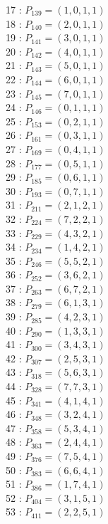 \documentclass{article}
\begin{document}
{\begin{multicols}{3}
17 : $P_{139}=( 1, 0, 1, 1 )$\\
18 : $P_{140}=( 2, 0, 1, 1 )$\\
19 : $P_{141}=( 3, 0, 1, 1 )$\\
20 : $P_{142}=( 4, 0, 1, 1 )$\\
21 : $P_{143}=( 5, 0, 1, 1 )$\\
22 : $P_{144}=( 6, 0, 1, 1 )$\\
23 : $P_{145}=( 7, 0, 1, 1 )$\\
24 : $P_{146}=( 0, 1, 1, 1 )$\\
25 : $P_{153}=( 0, 2, 1, 1 )$\\
26 : $P_{161}=( 0, 3, 1, 1 )$\\
27 : $P_{169}=( 0, 4, 1, 1 )$\\
28 : $P_{177}=( 0, 5, 1, 1 )$\\
29 : $P_{185}=( 0, 6, 1, 1 )$\\
30 : $P_{193}=( 0, 7, 1, 1 )$\\
31 : $P_{211}=( 2, 1, 2, 1 )$\\
32 : $P_{224}=( 7, 2, 2, 1 )$\\
33 : $P_{229}=( 4, 3, 2, 1 )$\\
34 : $P_{234}=( 1, 4, 2, 1 )$\\
35 : $P_{246}=( 5, 5, 2, 1 )$\\
36 : $P_{252}=( 3, 6, 2, 1 )$\\
37 : $P_{263}=( 6, 7, 2, 1 )$\\
38 : $P_{279}=( 6, 1, 3, 1 )$\\
39 : $P_{285}=( 4, 2, 3, 1 )$\\
40 : $P_{290}=( 1, 3, 3, 1 )$\\
41 : $P_{300}=( 3, 4, 3, 1 )$\\
42 : $P_{307}=( 2, 5, 3, 1 )$\\
43 : $P_{318}=( 5, 6, 3, 1 )$\\
44 : $P_{328}=( 7, 7, 3, 1 )$\\
45 : $P_{341}=( 4, 1, 4, 1 )$\\
46 : $P_{348}=( 3, 2, 4, 1 )$\\
47 : $P_{358}=( 5, 3, 4, 1 )$\\
48 : $P_{363}=( 2, 4, 4, 1 )$\\
49 : $P_{376}=( 7, 5, 4, 1 )$\\
50 : $P_{383}=( 6, 6, 4, 1 )$\\
51 : $P_{386}=( 1, 7, 4, 1 )$\\
52 : $P_{404}=( 3, 1, 5, 1 )$\\
53 : $P_{411}=( 2, 2, 5, 1 )$\\

\end{multicols}}
\end{document}
